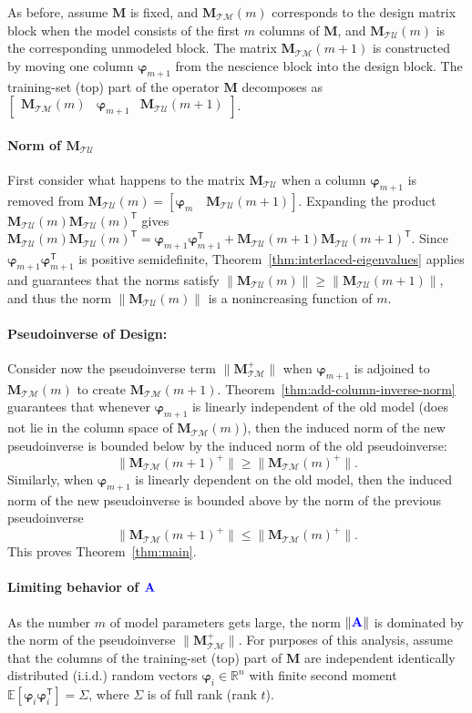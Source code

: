 \documentclass[twocolumn,aps,prx,superscriptaddress,10pt]{revtex4-2}
\newcommand{\0}{\bm{0}}
\newcommand{\bphi}{\boldsymbol{\varphi}}
\newcommand{\M}{\mathcal{M}} %
\newcommand{\T}{\mathcal{T}} %
\newcommand{\U}{\mathcal{U}} %
\newcommand{\bbA}{{\color{blue}{\mathbf{A}}}}  %
\newcommand{\bbM}{\mathbf{M}}
\newcommand{\MTM}{\bbM_{\T\M}}
\newcommand{\MTU}{\bbM_{\T\U}}
\newcommand{\trp}{^{\mathsf{T}}}  %
\newcommand{\ev}{\mathbb{E}} %
\newcommand{\R}{\mathbb{R}}
\begin{document}
As before, assume $\bbM$ is fixed, and $\MTM(m)$ corresponds to the design matrix block when the model consists of the first $m$ columns of $\bbM$, and $\MTU(m)$ is the corresponding unmodeled block.
The matrix $\MTM(m+1)$ is constructed by moving one column $\bphi_{m+1}$ from the nescience block into the design block.  The  training-set (top) part of the operator $\bbM$ decomposes as    
$\begin{bmatrix}\MTM(m) & \bphi_{m+1} & \MTU(m+1)
\end{bmatrix}$.

\paragraph{Norm of $\MTU$}
First consider what happens to the matrix $\MTU$ when a column $\bphi_{m+1}$ is removed from $\MTU(m) = [\bphi_{m} \quad \MTU(m+1)]$.
Expanding the product $\MTU(m) \MTU(m)\trp$ gives 
$\MTU(m)\MTU(m)\trp = \bphi_{m+1}\bphi_{m+1}\trp + \MTU(m+1)\MTU(m+1)\trp$.  
Since $\bphi_{m+1}\bphi_{m+1}\trp$ is positive semidefinite,  Theorem~\ref{thm:interlaced-eigenvalues} applies and 
guarantees that the 
norms satisfy $\|\MTU(m)\| \ge \|\MTU(m+1)\|$, and thus the norm $\|\MTU(m)\|$ is a nonincreasing function of $m$.  

\paragraph{Pseudoinverse of Design:}
Consider now the pseudoinverse term $\|\MTM^+\|$ when $\bphi_{m+1}$ is adjoined to $\MTM(m)$ to create  $\MTM(m+1)$. Theorem~\ref{thm:add-column-inverse-norm} guarantees that whenever $\bphi_{m+1}$ is linearly independent of the old model (does not lie in the column space of $\MTM(m)$), then the induced norm of the new pseudoinverse is bounded below by the induced norm of the old pseudoinverse:  
\[
\|\MTM(m+1)^+\| \ge \|\MTM(m)^+\|.
\]
Similarly, when $\bphi_{m+1}$ is linearly dependent on the old model, then the induced norm of the new pseudoinverse is bounded above by the norm of the previous pseudoinverse
\[
\|\MTM(m+1)^+\| \le \|\MTM(m)^+\|.
\]
This proves Theorem~\ref{thm:main}.


\paragraph{Limiting behavior of \texorpdfstring{$\bbA$}{A}}\label{methods:limit-of-A}
As the number $m$ of model parameters gets large, the norm $\|\bbA\|$ is dominated by the norm of the pseudoinverse $\|\MTM^+\|$.   For purposes of this analysis, assume that the columns of the training-set (top) part of $\bbM$ are independent identically distributed (i.i.d.) random vectors $\bphi_i\in \R^n$ with finite second moment $\ev[\bphi_i \bphi_i\trp] = \Sigma$, where $\Sigma$ is of full rank (rank $t$).   
\end{document}
